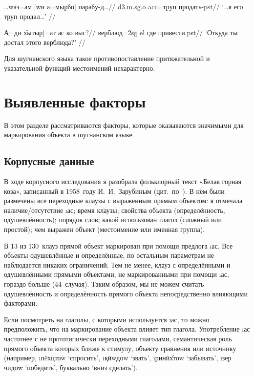 \begingl
\gla …wаз=ам {[}wи \b{а}=мырδо{]} параδу-д…//
 {\sc d3.m.sg.o} {\sc acc}=труп продать-{\sc pst}//
\glft ‘…я его труп продал…’ //
\endgl \xe

\begingl
\gla {[}\b{А}=ди х̌ытыр{]}=ат ас ко выг?//
 верблюд={\sc 2sg} {\sc el} где привести.{\sc pst}//
\glft ‘Откуда ты достал этого верблюда?’ //
\endgl \xe

Для шугнанского языка такое противопоставление притяжательной и указательной функций местоимений нехарактерно.

\section{Выявленные факторы} \label{dom-factors}

В этом разделе рассматриваются факторы, которые оказываются значимыми для маркирования объекта в шугнанском языке.

\subsection{Корпусные данные} \label{dom-corpus}

В ходе корпусного исследования я разобрала фольклорный текст «Белая горная коза», записанный в 1958~году И.~И.~Зарубиным (цит.~по~\parencite[85–91]{shakarmamadov2005}). В нём были размечены все переходные клаузы с выраженным прямым объектом: я отмечала наличие/отсутствие \i{ас}; время клаузы; свойства объекта (определённость, одушевлённость); порядок слов; какой использован глагол (сложный или простой); чем выражен объект (местоимение или именная группа).

В 13 из 130~клауз прямой объект маркирован при помощи предлога \i{ас}. Все объекты одушевлённые и определённые, по остальным параметрам не наблюдается никаких ограничений. Тем не менее, клауз с определёнными и одушевлёнными прямыми объектами, не маркированными при помощи \i{ас}, гораздо больше (44~случая). Таким образом, мы не можем считать одушевлённость и определённость прямого объекта непосредственно влияющими факторами.

Если посмотреть на глаголы, с которыми используется \i{ас}, то можно предположить, что на маркирование объекта влияет тип глагола. Употребление \i{ас} частотнее с не прототипически переходными глаголами, семантическая роль прямого объекта которых ближе к стимулу, объекту сравнения или источнику (например, \i{пêхцтоw} ‘спросить’, \i{қӣwдоw} ‘звать’, \i{ринӣх̌тоw} ‘забывать’, \i{зер чӣдоw} ‘победить’, буквально ‘вниз сделать’).

